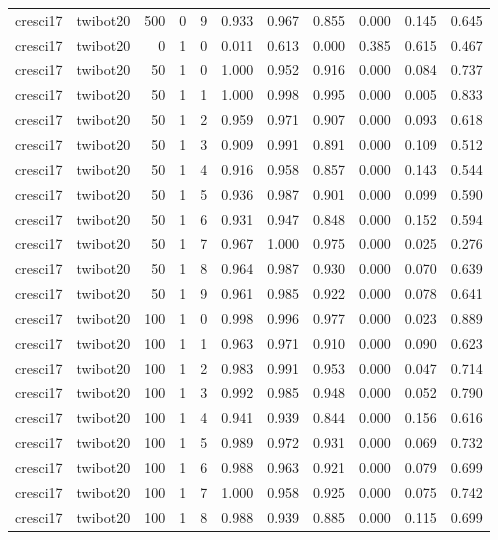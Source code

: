\begin{tabular}{llrrrrrrrrr}
cresci17 & twibot20 & 500 & 0 & 9 & 0.933 & 0.967 & 0.855 & 0.000 & 0.145 & 0.645 \\
cresci17 & twibot20 & 0 & 1 & 0 & 0.011 & 0.613 & 0.000 & 0.385 & 0.615 & 0.467 \\
cresci17 & twibot20 & 50 & 1 & 0 & 1.000 & 0.952 & 0.916 & 0.000 & 0.084 & 0.737 \\
cresci17 & twibot20 & 50 & 1 & 1 & 1.000 & 0.998 & 0.995 & 0.000 & 0.005 & 0.833 \\
cresci17 & twibot20 & 50 & 1 & 2 & 0.959 & 0.971 & 0.907 & 0.000 & 0.093 & 0.618 \\
cresci17 & twibot20 & 50 & 1 & 3 & 0.909 & 0.991 & 0.891 & 0.000 & 0.109 & 0.512 \\
cresci17 & twibot20 & 50 & 1 & 4 & 0.916 & 0.958 & 0.857 & 0.000 & 0.143 & 0.544 \\
cresci17 & twibot20 & 50 & 1 & 5 & 0.936 & 0.987 & 0.901 & 0.000 & 0.099 & 0.590 \\
cresci17 & twibot20 & 50 & 1 & 6 & 0.931 & 0.947 & 0.848 & 0.000 & 0.152 & 0.594 \\
cresci17 & twibot20 & 50 & 1 & 7 & 0.967 & 1.000 & 0.975 & 0.000 & 0.025 & 0.276 \\
cresci17 & twibot20 & 50 & 1 & 8 & 0.964 & 0.987 & 0.930 & 0.000 & 0.070 & 0.639 \\
cresci17 & twibot20 & 50 & 1 & 9 & 0.961 & 0.985 & 0.922 & 0.000 & 0.078 & 0.641 \\
cresci17 & twibot20 & 100 & 1 & 0 & 0.998 & 0.996 & 0.977 & 0.000 & 0.023 & 0.889 \\
cresci17 & twibot20 & 100 & 1 & 1 & 0.963 & 0.971 & 0.910 & 0.000 & 0.090 & 0.623 \\
cresci17 & twibot20 & 100 & 1 & 2 & 0.983 & 0.991 & 0.953 & 0.000 & 0.047 & 0.714 \\
cresci17 & twibot20 & 100 & 1 & 3 & 0.992 & 0.985 & 0.948 & 0.000 & 0.052 & 0.790 \\
cresci17 & twibot20 & 100 & 1 & 4 & 0.941 & 0.939 & 0.844 & 0.000 & 0.156 & 0.616 \\
cresci17 & twibot20 & 100 & 1 & 5 & 0.989 & 0.972 & 0.931 & 0.000 & 0.069 & 0.732 \\
cresci17 & twibot20 & 100 & 1 & 6 & 0.988 & 0.963 & 0.921 & 0.000 & 0.079 & 0.699 \\
cresci17 & twibot20 & 100 & 1 & 7 & 1.000 & 0.958 & 0.925 & 0.000 & 0.075 & 0.742 \\
cresci17 & twibot20 & 100 & 1 & 8 & 0.988 & 0.939 & 0.885 & 0.000 & 0.115 & 0.699 \\

\end{tabular}
